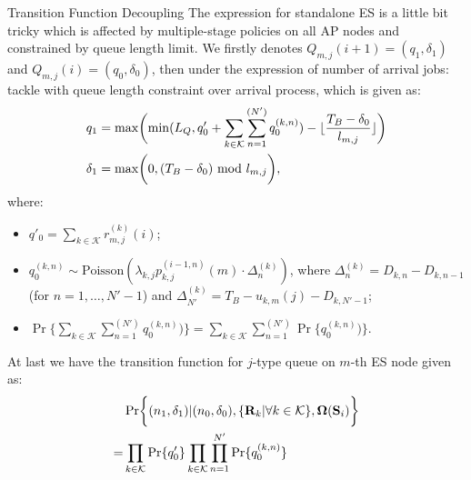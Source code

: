 \documentclass[10pt, conference, letterpaper]{IEEEtran}
\newcommand{\mat}{\mathbf}
\newcommand{\Poisson}{\text{Poisson}}
\DeclarePairedDelimiter{\set}{\{}{\}}
\DeclarePairedDelimiter{\Paren}{\bigg(}{\bigg)}
\DeclarePairedDelimiter{\Brace}{\bigg\{}{\bigg\}}
\newcommand{\apSet}{\mathcal{K}}
\newcommand{\Stat}{\mathbf{S}}
\newcommand{\Policy}{\boldsymbol{\Omega}}
\newcommand{\BPolicy}{\Policy} %
\begin{document}
\begin{section}{Transition Function Decoupling}
        The expression for standalone ES is a little bit tricky which is affected by multiple-stage policies on all AP nodes and constrained by queue length limit.
        We firstly denotes $Q_{m,j}(i+1)=(q_1,\delta_1)$ and $Q_{m,j}(i)=(q_0,\delta_0)$, then under the expression of number of arrival jobs:
        tackle with queue length constraint over arrival process, which is given as:
        \begin{align*}
            q_1 &= \max\Paren{
                \min(L_Q, q'_0 + \sum_{k\in\apSet}\sum_{n=1}^{(N')}q_0^{(k,n)}) - \lfloor{\frac{T_B-\delta_0}{l_{m,j}}}\rfloor
            }
            \\
            \delta_1 &= \max\Paren{
                0, (T_B-\delta_0) \text{ mod } l_{m,j}
            },
        \end{align*}
        where:
        \begin{itemize}
            \item $q'_0 = \sum_{k\in\apSet}r^{(k)}_{m,j}(i)$;
            \item $q_0^{(k,n)} \sim \Poisson(\lambda_{k,j}p^{(i-1,n)}_{k,j}(m) \cdot \Delta^{(k)}_{n})$, where $\Delta^{(k)}_{n}=D_{k,n} - D_{k,n-1}$ (for $n=1,\dots,N'-1$) and $\Delta^{(k)}_{N'} = T_B-u_{k,m}(j)-D_{k,N'-1}$;
            \item $\Pr\{ \sum_{k\in\apSet}\sum_{n=1}^{(N')}q_0^{(k,n)}) \} = \sum_{k\in\apSet}\sum_{n=1}^{(N')} \Pr\{q_0^{(k,n)})\}$.
        \end{itemize}
        At last we have the transition function for $j$-type queue on $m$-th ES node given as:
        \begin{align*}
            & \Pr\Brace{(n_1,\delta_1)|(n_0,\delta_0), \set{\mat{R}_{k}|\forall k\in\apSet}, \BPolicy(\Stat_i)}
            \nonumber\\
            =& \prod_{k\in\apSet} \Pr\{q'_0\} \prod_{k\in\apSet}\prod_{n=1}^{N'} \Pr\{q_0^{(k,n)}\}
        \end{align*}
    \end{section}
    
    
    
\end{document}
